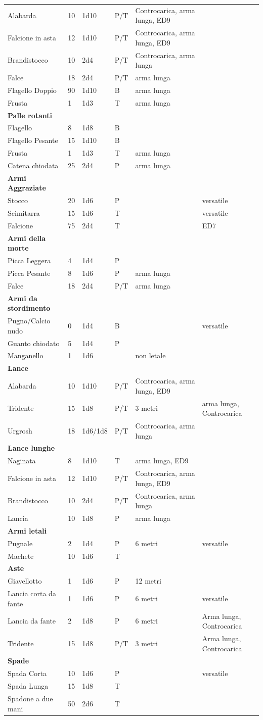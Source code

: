 \documentclass[a4paper,11pt,twoside,openany]{book}
\begin{document}
{\begin{longtable}{|L{3.5cm} |k{1,3cm} |k{1.5cm}| k{1.3cm} |L{4.5cm} |k{3cm}|}
	Alabarda & 10 & 1d10 & P/T & Controcarica, arma lunga, ED9 & \tabularnewline
	Falcione in asta & 12 & 1d10 & P/T & Controcarica, arma lunga, ED9 & \tabularnewline
	Brandistocco & 10 & 2d4 & P/T & Controcarica, arma lunga & \tabularnewline
	Falce & 18 & 2d4 & P/T & arma lunga & \tabularnewline
	Flagello Doppio & 90 & 1d10 & B & arma lunga & \tabularnewline
	Frusta & 1 & 1d3 & T & arma lunga & \tabularnewline
	\textbf{Palle rotanti} & & & & & \tabularnewline
	Flagello & 8 & 1d8 & B & & \tabularnewline
	Flagello Pesante & 15 & 1d10 & B & & \tabularnewline
	Frusta & 1 & 1d3 & T & arma lunga & \tabularnewline
	Catena chiodata & 25 & 2d4 & P & arma lunga & \tabularnewline
	\textbf{Armi Aggraziate} & & & & & \tabularnewline
	Stocco & 20 & 1d6 & P & & versatile\tabularnewline
	Scimitarra & 15 & 1d6 & T & & versatile\tabularnewline
	Falcione & 75 & 2d4 & T & & ED7\tabularnewline
	\textbf{Armi della morte} & & & & & \tabularnewline
	Picca Leggera & 4 & 1d4 & P & & \tabularnewline
	Picca Pesante & 8 & 1d6 & P & arma lunga & \tabularnewline
	Falce & 18 & 2d4 & P/T & arma lunga & \tabularnewline
	\textbf{Armi da stordimento} & & & & & \tabularnewline
	Pugno/Calcio nudo & 0 & 1d4 & B & & versatile\tabularnewline
	Guanto chiodato & 5 & 1d4 & P & & \tabularnewline
	Manganello & 1 & 1d6 & & non letale & \tabularnewline
	\textbf{Lance} & & & & & \tabularnewline
	Alabarda & 10 & 1d10 & P/T & Controcarica, arma lunga, ED9 & \tabularnewline
	Tridente & 15 & 1d8 & P/T & 3 metri & arma lunga, Controcarica \tabularnewline
	Urgrosh & 18 & 1d6/1d8 & P/T & Controcarica, arma lunga & \tabularnewline
	\textbf{Lance lunghe} & & & & & \tabularnewline
	Naginata & 8 & 1d10 & T & arma lunga, ED9 & \tabularnewline
	Falcione in asta & 12 & 1d10 & P/T & Controcarica, arma lunga, ED9 & \tabularnewline
	Brandistocco & 10 & 2d4 & P/T & Controcarica, arma lunga & \tabularnewline
	Lancia & 10 & 1d8 & P & arma lunga & \tabularnewline
	\textbf{Armi letali} & & & & & \tabularnewline
	Pugnale & 2 & 1d4 & P & 6 metri & versatile\tabularnewline
	Machete & 10 & 1d6 & T & & \tabularnewline
	\textbf{Aste} & & & & & \tabularnewline
	Giavellotto & 1 & 1d6 & P & 12 metri & \tabularnewline
	Lancia corta da fante & 1 & 1d6 & P & 6 metri & versatile\tabularnewline
	Lancia da fante & 2 & 1d8 & P & 6 metri &Arma lunga, Controcarica \tabularnewline
	Tridente & 15 & 1d8 & P/T & 3 metri & Arma lunga, Controcarica \tabularnewline
	\textbf{Spade} & & & & & \tabularnewline
	Spada Corta & 10 & 1d6 & P & & versatile\tabularnewline
	Spada Lunga & 15 & 1d8 & T & & \tabularnewline
	Spadone a due mani & 50 & 2d6 & T & & \tabularnewline

\end{longtable}}
\end{document}
